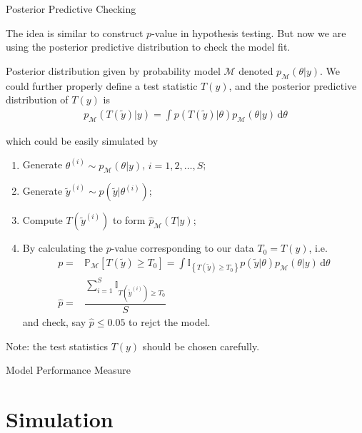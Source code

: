 \begin{point}
    Posterior Predictive Checking
\end{point}

The idea is similar to construct $ p $-value in hypothesis testing. But now we are using the posterior predictive distribution to check the model fit. 

Posterior distribution given by probability model $ \mathcal{M} $ denoted $ p_\mathcal{M}(\theta |y) $. We could further properly define a test statistic $ T(y) $, and the posterior predictive distribution of $ T(y) $ is
\begin{align*}
    p_\mathcal{M}(T(\tilde{y})|y)=\int p(T(\tilde{y})|\theta )p_\mathcal{M}(\theta |y)\,\mathrm{d}\theta
\end{align*}

which could be easily simulated by 
\begin{enumerate}[topsep=2pt,itemsep=2pt]
    \item Generate $ \theta ^{(i)}\sim p_\mathcal{M}(\theta |y) $, $ i=1,2,\ldots,S $;
    \item Generate $ \tilde{y}^{(i)}\sim p(\tilde{y}|\theta ^{(i)}) $;
    \item Compute $ T(\tilde{y}^{(i)}) $ to form $ \hat{p}_\mathcal{M}(T|y) $;
    \item By calculating the $ p $-value corresponding to our data $ T_0=T(y) $, i.e.
    \begin{align*}
        p=& \mathbb{P}_{\mathcal{M}}\left[ T(\tilde{y})\geqslant T_0 \right] =\int \mathbb{I}_{\left\{ T(\tilde{y})\geqslant T_0 \right\} }p(\tilde{y}|\theta )p_\mathcal{M}(\theta |y)\,\mathrm{d}\theta\\
        \hat{p}=& \dfrac{ \sum_{i=1}^S\mathbb{I}_{T(\tilde{y}^{(i)})\geq T_0} }{ S }
    \end{align*}
    and check, say $ \hat{p}\leq 0.05 $ to rejct the model.
    
\end{enumerate}

Note: the test statistics $ T(y) $ should be chosen carefully.

    



\begin{point}
    Model Performance Measure
\end{point}


    
\section{Simulation}

